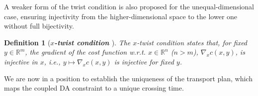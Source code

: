 \documentclass[11pt]{article}
\newcommand{\purple}{\color{purple}}
\newtheorem{definition}{Definition}
\newtheorem{proposition}{Proposition}
\begin{document}
A weaker form of the twist condition is also proposed for the unequal-dimensional case, ensuring injectivity from the higher-dimensional space to the lower one without full bijectivity.
\begin{definition}[\bf \textit{$x$-twist condition} \cite{chiappori2020multidimensional}]\label{def:x-twist}
The $x$-twist condition states that, for fixed $y \in \mathbb{R}^m$, the gradient of the cost function w.r.t. $x \in \mathbb{R}^n$ ($n > m$), $\nabla_x c(x,y)$, is injective in $x$, i.e., $y \mapsto \nabla_x c(x,y)$   
is injective for fixed $y$.
\end{definition}

We are now in a position to establish the uniqueness of the transport plan, which maps the coupled DA constraint to a unique crossing time.



\end{document}
